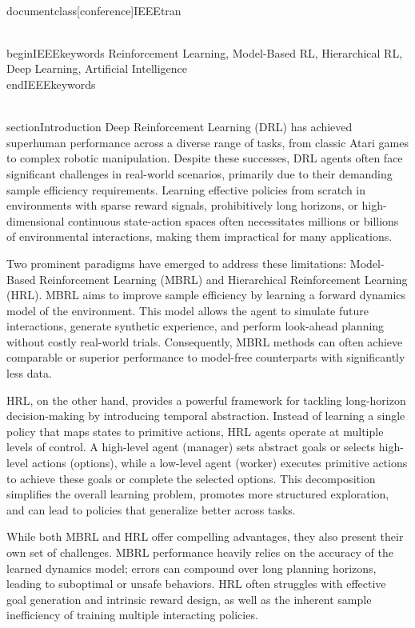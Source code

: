 \\documentclass[conference]{IEEEtran}
\begin{document}
\\begin{IEEEkeywords}
Reinforcement Learning, Model-Based RL, Hierarchical RL, Deep Learning, Artificial Intelligence
\\end{IEEEkeywords}

\\section{Introduction}
Deep Reinforcement Learning (DRL) has achieved superhuman performance across a diverse range of tasks, from classic Atari games to complex robotic manipulation. Despite these successes, DRL agents often face significant challenges in real-world scenarios, primarily due to their demanding sample efficiency requirements. Learning effective policies from scratch in environments with sparse reward signals, prohibitively long horizons, or high-dimensional continuous state-action spaces often necessitates millions or billions of environmental interactions, making them impractical for many applications.

Two prominent paradigms have emerged to address these limitations: Model-Based Reinforcement Learning (MBRL) and Hierarchical Reinforcement Learning (HRL). MBRL aims to improve sample efficiency by learning a forward dynamics model of the environment. This model allows the agent to simulate future interactions, generate synthetic experience, and perform look-ahead planning without costly real-world trials. Consequently, MBRL methods can often achieve comparable or superior performance to model-free counterparts with significantly less data.

HRL, on the other hand, provides a powerful framework for tackling long-horizon decision-making by introducing temporal abstraction. Instead of learning a single policy that maps states to primitive actions, HRL agents operate at multiple levels of control. A high-level agent (manager) sets abstract goals or selects high-level actions (options), while a low-level agent (worker) executes primitive actions to achieve these goals or complete the selected options. This decomposition simplifies the overall learning problem, promotes more structured exploration, and can lead to policies that generalize better across tasks.

While both MBRL and HRL offer compelling advantages, they also present their own set of challenges. MBRL performance heavily relies on the accuracy of the learned dynamics model; errors can compound over long planning horizons, leading to suboptimal or unsafe behaviors. HRL often struggles with effective goal generation and intrinsic reward design, as well as the inherent sample inefficiency of training multiple interacting policies.
\end{document}
